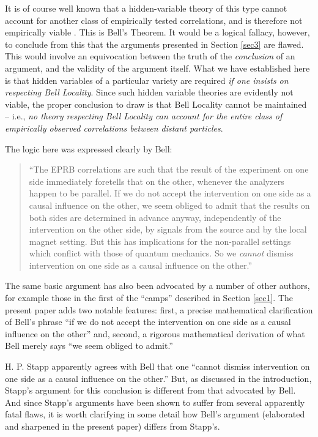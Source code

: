 \documentclass[aps,prc,onecolumn,12pt,nofootinbib]{revtex4-2}
\begin{document}
It is of course well known that a hidden-variable theory of this type
cannot account for another class of empirically tested
correlations, and is therefore not empirically viable \cite{aspect}.
This is Bell's
Theorem.  It would be a logical fallacy, however, to conclude from
this that the arguments presented in Section \ref{sec3} are flawed.
This would involve an equivocation between the truth of the \emph{conclusion}
of an argument, and the validity of the argument itself.  What we
have established here is that hidden variables of a particular variety
are required \emph{if one insists on respecting Bell Locality}.  Since
such hidden variable theories are evidently not viable, the proper conclusion
to draw is that Bell Locality cannot be maintained -- i.e., \emph{no theory
respecting Bell Locality can account for the entire class of
empirically observed correlations between distant particles}.

The logic here was expressed clearly by Bell:
\begin{quote}
``The EPRB correlations are such that the result of the
experiment on one side immediately foretells that on the other,
whenever the analyzers happen to be parallel.  If we do not accept the
intervention on one side as a causal influence on the other, we seem
obliged to admit that the results on both sides are determined in
advance anyway, independently of the intervention on the other side,
by signals from the source and by the local magnet setting.  But
this has implications for the non-parallel settings which
conflict with those of quantum mechanics.  So we \emph{cannot} dismiss
intervention on one side as a causal influence on the other.''
\cite[pg 149-50]{bell}
\end{quote}
The same basic argument has also been advocated by a number of other
authors, for example those in the first
of the ``camps'' described in Section \ref{sec1}.  The present paper adds two
notable features:  first, a precise mathematical clarification of
Bell's phrase ``if we do not accept the intervention on one side as
a causal influence on the other'' and, second, a rigorous mathematical
derivation of what Bell merely says ``we seem obliged to admit.''

H. P. Stapp apparently agrees with Bell that one ``cannot dismiss
intervention on one side as a causal influence on the other.''
But, as discussed in the introduction, Stapp's argument
for this conclusion is different from that advocated by Bell.
And since Stapp's arguments have been shown to suffer
from several apparently fatal flaws, it is worth clarifying in some
detail how Bell's argument (elaborated and sharpened in the present
paper) differs from Stapp's.
\end{document}
